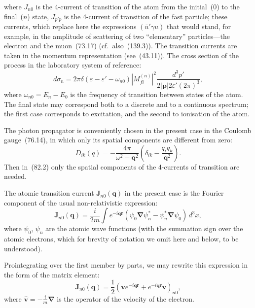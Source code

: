 where $J_{n0}$ is the 4-current of transition of the atom from the initial~(0) to the final~($n$) state, $J_{p'p}$ is the 4-current of transition of the fast particle; these currents, which replace here the expressions $(\bar{u}'\gamma u)$ that would stand, for example, in the amplitude of scattering of two ``elementary'' particles---the electron and the muon~(73.17) (cf.\ also~(139.3)). The transition currents are taken in the momentum representation (see~(43.11)). The cross section of the process in the laboratory system of reference:
\begin{equation}
d\sigma_n = 2\pi\delta(\varepsilon - \varepsilon' - \omega_{n0})\left|M_{fi}^{(n)}\right|^2\frac{d^3p'}{2|\mathbf{p}|2\varepsilon'(2\pi)^3},
\tag{82.3}
\end{equation}
where $\omega_{n0} = E_n - E_0$ is the frequency of transition between states of the atom. The final state may correspond both to a discrete and to a continuous spectrum; the first case corresponds to excitation, and the second to ionisation of the atom.

The photon propagator is conveniently chosen in the present case in the Coulomb gauge~(76.14), in which only its spatial components are different from zero:
\begin{equation}
D_{ik}(q) = -\frac{4\pi}{\omega^2 - \mathbf{q}^2}\left(\delta_{ik} - \frac{q_i q_k}{\mathbf{q}^2}\right).
\tag{82.4}
\end{equation}
Then in~(82.2) only the spatial components of the 4-currents of transition are needed.

The atomic transition current $\mathbf{J}_{n0}(\mathbf{q})$ in the present case is the Fourier component of the usual non-relativistic expression:
\begin{equation}
\mathbf{J}_{n0}(\mathbf{q}) = \frac{i}{2m}\int e^{-i\mathbf{qr}}(\psi_0\boldsymbol{\nabla}\psi_n^* - \psi_n^*\boldsymbol{\nabla}\psi_0)\,d^3x,
\tag{82.5}
\end{equation}
where $\psi_0$, $\psi_n$ are the atomic wave functions (with the summation sign over the atomic electrons, which for brevity of notation we omit here and below, to be understood).

Prointegrating over the first member by parts, we may rewrite this expression in the form of the matrix element:
\begin{equation}
\mathbf{J}_{n0}(\mathbf{q}) = \frac{1}{2}(\mathbf{v}e^{-i\mathbf{qr}} + e^{-i\mathbf{qr}}\mathbf{v})_{n0},
\tag{82.6}
\end{equation}
where $\hat{\mathbf{v}} = -\frac{i}{m}\boldsymbol{\nabla}$ is the operator of the velocity of the electron.

